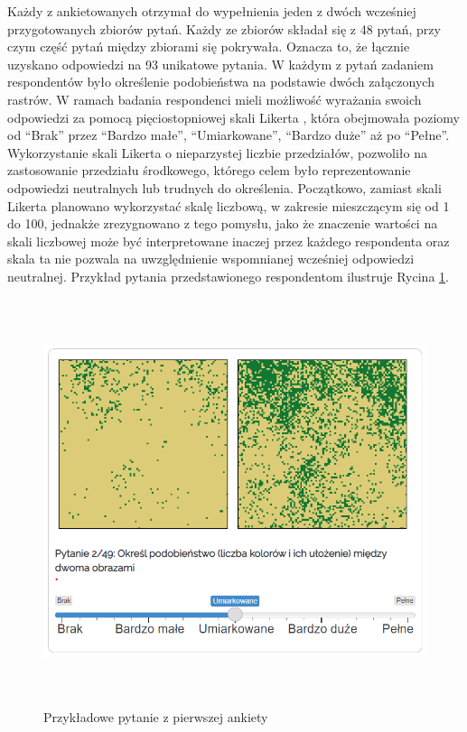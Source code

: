 \documentclass{amuthesis}
\begin{document}
Każdy z ankietowanych otrzymał do wypełnienia jeden z dwóch wcześniej
przygotowanych zbiorów pytań. Każdy ze zbiorów składał się z 48 pytań,
przy czym część pytań między zbiorami się pokrywała. Oznacza to, że
łącznie uzyskano odpowiedzi na 93 unikatowe pytania. W każdym z pytań
zadaniem respondentów było określenie podobieństwa na podstawie dwóch
załączonych rastrów. W ramach badania respondenci mieli możliwość
wyrażania swoich odpowiedzi za pomocą pięciostopniowej skali Likerta
\autocite{likert_scale}, która obejmowała poziomy od ``Brak'' przez
``Bardzo małe'', ``Umiarkowane'', ``Bardzo duże'' aż po ``Pełne''.
Wykorzystanie skali Likerta o nieparzystej liczbie przedziałów,
pozwoliło na zastosowanie przedziału środkowego, którego celem było
reprezentowanie odpowiedzi neutralnych lub trudnych do określenia.
Początkowo, zamiast skali Likerta planowano wykorzystać skalę liczbową,
w zakresie mieszczącym się od 1 do 100, jednakże zrezygnowano z tego
pomysłu, jako że znaczenie wartości na skali liczbowej może być
interpretowane inaczej przez każdego respondenta oraz skala ta nie
pozwala na uwzględnienie wspomnianej wcześniej odpowiedzi neutralnej.
Przykład pytania przedstawionego respondentom ilustruje Rycina
\ref{fig-przyklad_pytania}.

\begin{figure}[t]

{\centering \includegraphics[width=1\textwidth,height=4.6875in]{figures/przyklad_pytania.png}

}

\caption{\label{fig-przyklad_pytania}Przykładowe pytanie z pierwszej
ankiety}

\end{figure}
\end{document}
